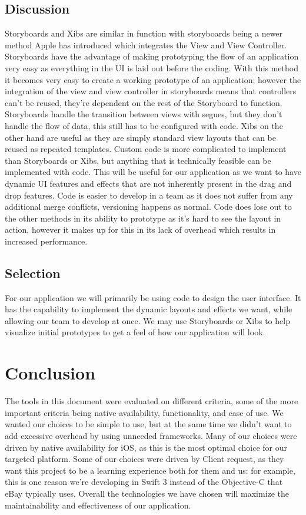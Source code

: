 \documentclass[letterpaper,10pt,titlepage]{article}
\begin{document}
\subsection{Discussion}
Storyboards and Xibs are similar in function with storyboards being a newer method Apple has introduced which integrates the View and View Controller. Storyboards have the advantage of making prototyping the flow of an application very easy as everything in the UI is laid out before the coding. With this method it becomes very easy to create a working prototype of an application; however the integration of the view and view controller in storyboards means that controllers can't be reused, they're dependent on the rest of the Storyboard to function. Storyboards handle the transition between views with segues, but they don't handle the flow of data, this still has to be configured with code. Xibs on the other hand are useful as they are simply standard view layouts that can be reused as repeated templates. Custom code is more complicated to implement than Storyboards or Xibs, but anything that is technically feasible can be implemented with code. This will be useful for our application as we want to have dynamic UI features and effects that are not inherently present in the drag and drop features. Code is easier to develop in a team as it does not suffer from any additional merge conflicts, versioning happens as normal. Code does lose out to the other methods in its ability to prototype as it's hard to see the layout in action, however it makes up for this in its lack of overhead which results in increased performance.


\subsection{Selection}
For our application we will primarily be using code to design the user interface. It has the capability to implement the dynamic layouts and effects we want, while allowing our team to develop at once. We may use Storyboards or Xibs to help visualize initial prototypes to get a feel of how our application will look.

\section{Conclusion}
The tools in this document were evaluated on different criteria, some of the more important criteria being native availability, functionality, and ease of use. We wanted our choices to be simple to use, but at the same time we didn’t want to add excessive overhead by using unneeded frameworks. Many of our choices were driven by native availability for iOS, as this is the most optimal choice for our targeted platform. Some of our choices were driven by Client request, as they want this project to be a learning experience both for them and us: for example, this is one reason we’re developing in Swift 3 instead of the Objective-C that eBay typically uses. Overall the technologies we have chosen will maximize the maintainability and effectiveness of our application.\\
\end{document}
